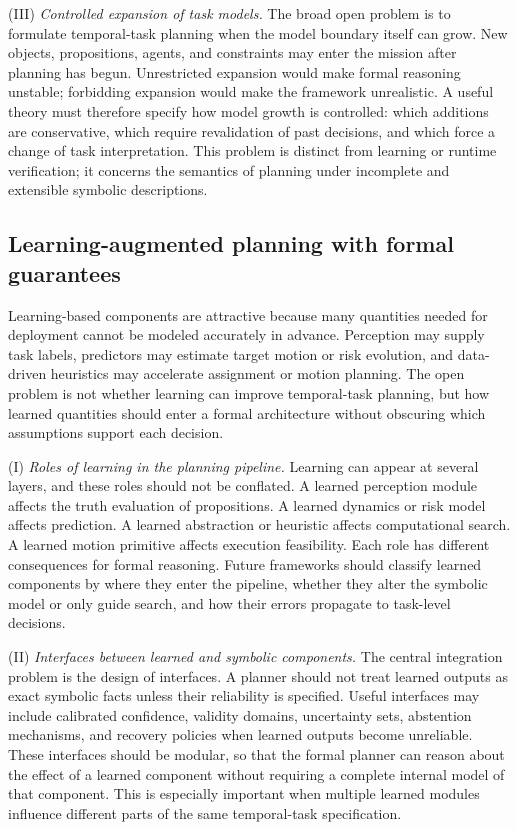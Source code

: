 (III) \emph{Controlled expansion of task models.}
The broad open problem is to formulate temporal-task planning when the model
boundary itself can grow. New objects, propositions, agents, and constraints
may enter the mission after planning has begun. Unrestricted expansion would
make formal reasoning unstable; forbidding expansion would make the framework
unrealistic. A useful theory must therefore specify how model growth is
controlled: which additions are conservative, which require revalidation of
past decisions, and which force a change of task interpretation. This problem
is distinct from learning or runtime verification; it concerns the semantics
of planning under incomplete and extensible symbolic descriptions.

\subsection{Learning-augmented planning with formal guarantees}
\label{sec:ch07_learning}

Learning-based components are attractive because many quantities needed for
deployment cannot be modeled accurately in advance. Perception may
supply task labels, predictors may estimate target motion or risk evolution,
and data-driven heuristics may accelerate assignment or motion planning. The
open problem is not whether learning can improve temporal-task planning, but
how learned quantities should enter a formal architecture without obscuring
which assumptions support each decision.

(I) \emph{Roles of learning in the planning pipeline.}
Learning can appear at several layers, and these roles should not be
conflated. A learned perception module affects the truth evaluation of
propositions. A learned dynamics or risk model affects prediction. A learned
abstraction or heuristic affects computational search. A learned motion
primitive affects execution feasibility. Each role has different consequences
for formal reasoning. Future frameworks should classify learned components by
where they enter the pipeline, whether they alter the symbolic model or only
guide search, and how their errors propagate to task-level decisions.

(II) \emph{Interfaces between learned and symbolic components.}
The central integration problem is the design of interfaces. A planner should
not treat learned outputs as exact symbolic facts unless their reliability is
specified. Useful interfaces may include calibrated confidence,
validity domains, uncertainty sets, abstention mechanisms, and recovery
policies when learned outputs become unreliable. These interfaces should be
modular, so that the formal planner can reason about the effect of a learned
component without requiring a complete internal model of that component. This
is especially important when multiple learned modules influence different
parts of the same temporal-task specification.

